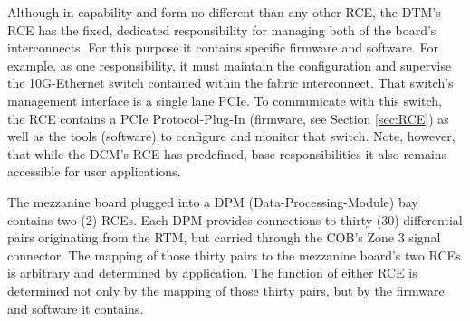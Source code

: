 Although in capability and form no different than any other RCE, the DTM's RCE has the fixed, dedicated responsibility for managing both of the board's interconnects. For this purpose it contains specific firmware and software. For example, as one responsibility, it must maintain the configuration and supervise the 10G-Ethernet switch contained within the fabric interconnect. That switch's management interface is a single lane PCIe. To communicate with this switch, the RCE contains a PCIe Protocol-Plug-In (firmware, see Section \ref{sec:RCE}) as well as the tools (software) to configure and monitor that switch. Note, however, that while the DCM's RCE has predefined, base responsibilities it also remains accessible for user applications.

The mezzanine board plugged into a DPM (Data-Processing-Module) bay contains two (2) RCEs. Each DPM provides connections to thirty (30) differential pairs originating from the RTM, but carried through the COB's Zone 3 signal connector. The mapping of those thirty pairs to the mezzanine board's two RCEs is arbitrary and determined by application. The function of either RCE is determined not only by the mapping of those thirty pairs, but by the firmware and software it contains.

